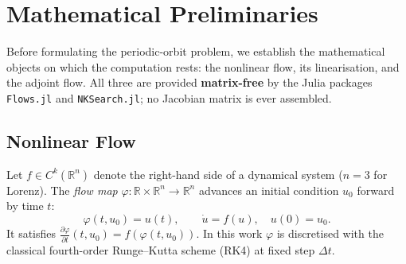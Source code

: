 \documentclass[11pt,a4paper]{article}
\begin{document}
\section{Mathematical Preliminaries}

Before formulating the periodic-orbit problem, we establish the mathematical
objects on which the computation rests: the nonlinear flow, its linearisation,
and the adjoint flow.  All three are provided \textbf{matrix-free} by the
Julia packages \texttt{Flows.jl} and \texttt{NKSearch.jl}; no Jacobian matrix
is ever assembled.

\subsection{Nonlinear Flow}
Let $f \in C^k(\mathbb{R}^n)$ denote the right-hand side of a dynamical
system ($n = 3$ for Lorenz).  The \emph{flow map}
$\varphi: \mathbb{R} \times \mathbb{R}^n \to \mathbb{R}^n$ advances an
initial condition $u_0$ forward by time $t$:
\begin{equation}\label{eq:flow_def}
  \varphi(t, u_0) = u(t),
  \qquad \dot{u} = f(u), \quad u(0) = u_0.
\end{equation}
It satisfies $\frac{\partial \varphi}{\partial t}(t, u_0)
= f(\varphi(t, u_0))$.  In this work $\varphi$ is discretised with the
classical fourth-order Runge--Kutta scheme (RK4) at fixed step $\Delta t$.
\end{document}
